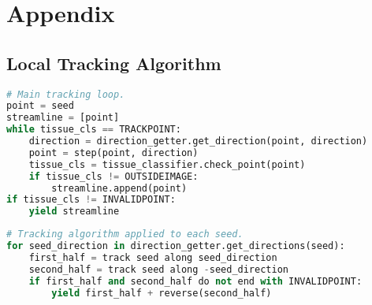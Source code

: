 \section{Appendix}
\begin{appendices}
\subsection{Local Tracking Algorithm}
\label{appendix:algo}



\begin{lstlisting}[language=python]
# Main tracking loop.
point = seed
streamline = [point]
while tissue_cls == TRACKPOINT:
    direction = direction_getter.get_direction(point, direction)
    point = step(point, direction)
    tissue_cls = tissue_classifier.check_point(point)
    if tissue_cls != OUTSIDEIMAGE:
        streamline.append(point)
if tissue_cls != INVALIDPOINT:
    yield streamline
\end{lstlisting}

\begin{lstlisting}[language=python]
# Tracking algorithm applied to each seed.
for seed_direction in direction_getter.get_directions(seed):
    first_half = track seed along seed_direction
    second_half = track seed along -seed_direction
    if first_half and second_half do not end with INVALIDPOINT:
        yield first_half + reverse(second_half)
\end{lstlisting}

\end{appendices}
